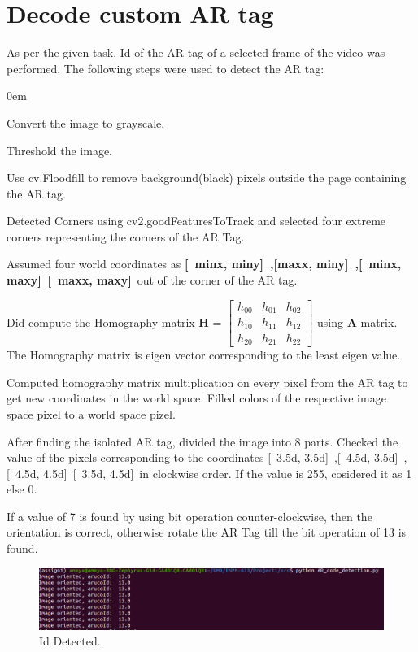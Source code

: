 \documentclass[11pt]{article}
\begin{document}
\section{Decode custom AR tag}
As per the given task, Id of the AR tag of a selected frame of the video was performed. The following steps were used to detect the AR tag:
\begin{description}

\addtolength{\itemindent}{0.80cm}
\itemsep0em 
\item[1.] Convert the image to grayscale.
\item[2.] Threshold the image.
\item[3.] Use cv.Floodfill to remove background(black) pixels outside the page containing the AR tag.
\item[4.] Detected Corners using cv2.goodFeaturesToTrack and selected four extreme corners representing the corners of the AR Tag.
\item[5.] Assumed four world coordinates as \textbf{[\ minx, miny]\ ,[\textbf {maxx, miny}]\ ,[\ minx, maxy]\, [\ maxx, maxy]}\ out of the corner of the AR tag.
\item[6.] Did compute the Homography matrix \textbf{H} =
			$\begin{bmatrix}
			h_{00} & h_{01} & h_{02}\\
			h_{10} & h_{11} & h_{12}\\
			h_{20} & h_{21} & h_{22}
			\end{bmatrix}$ using \textbf{A} matrix. The Homography matrix is eigen vector corresponding to the least eigen value.
\item[7.] Computed homography matrix multiplication on every pixel from the AR tag to get new coordinates in the world space. Filled colors of the respective image space pixel to a world space pizel. 
\item[8.] After finding the isolated AR tag, divided the image into 8 parts. Checked the value of the pixels corresponding to the coordinates [\ 3.5d, 3.5d]\ ,[\ 4.5d, 3.5d]\ ,[\ 4.5d, 4.5d]\, [\ 3.5d, 4.5d]\ in clockwise order. If the value is 255, cosidered it as 1 else 0. 
\item[9.] If a value of 7 is found by using bit operation counter-clockwise, then the orientation is correct, otherwise rotate the AR Tag till the bit operation of 13 is found.
\end{description}

\begin{figure}[!htbp]
  \centering
	\includegraphics[width=1\textwidth]{IdMarker}
	\caption{Id Detected.}
\end{figure}
\end{document}
